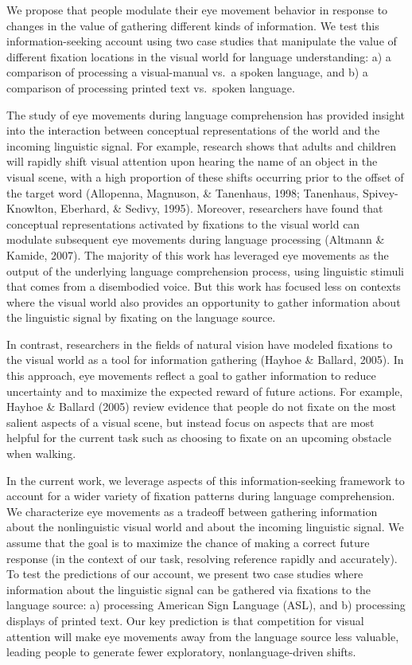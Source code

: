 \documentclass[10pt, letterpaper]{article}
\begin{document}
We propose that people modulate their eye movement behavior in response
to changes in the value of gathering different kinds of information. We
test this information-seeking account using two case studies that
manipulate the value of different fixation locations in the visual world
for language understanding: a) a comparison of processing a
visual-manual vs.~a spoken language, and b) a comparison of processing
printed text vs.~spoken language.

The study of eye movements during language comprehension has provided
insight into the interaction between conceptual representations of the
world and the incoming linguistic signal. For example, research shows
that adults and children will rapidly shift visual attention upon
hearing the name of an object in the visual scene, with a high
proportion of these shifts occurring prior to the offset of the target
word (Allopenna, Magnuson, \& Tanenhaus, 1998; Tanenhaus,
Spivey-Knowlton, Eberhard, \& Sedivy, 1995). Moreover, researchers have
found that conceptual representations activated by fixations to the
visual world can modulate subsequent eye movements during language
processing (Altmann \& Kamide, 2007). The majority of this work has
leveraged eye movements as the output of the underlying language
comprehension process, using linguistic stimuli that comes from a
disembodied voice. But this work has focused less on contexts where the
visual world also provides an opportunity to gather information about
the linguistic signal by fixating on the language source.

In contrast, researchers in the fields of natural vision have modeled
fixations to the visual world as a tool for information gathering
(Hayhoe \& Ballard, 2005). In this approach, eye movements reflect a
goal to gather information to reduce uncertainty and to maximize the
expected reward of future actions. For example, Hayhoe \& Ballard (2005)
review evidence that people do not fixate on the most salient aspects of
a visual scene, but instead focus on aspects that are most helpful for
the current task such as choosing to fixate on an upcoming obstacle when
walking.

In the current work, we leverage aspects of this information-seeking
framework to account for a wider variety of fixation patterns during
language comprehension. We characterize eye movements as a tradeoff
between gathering information about the nonlinguistic visual world and
about the incoming linguistic signal. We assume that the goal is to
maximize the chance of making a correct future response (in the context
of our task, resolving reference rapidly and accurately). To test the
predictions of our account, we present two case studies where
information about the linguistic signal can be gathered via fixations to
the language source: a) processing American Sign Language (ASL), and b)
processing displays of printed text. Our key prediction is that
competition for visual attention will make eye movements away from the
language source less valuable, leading people to generate fewer
exploratory, nonlanguage-driven shifts.
\end{document}
